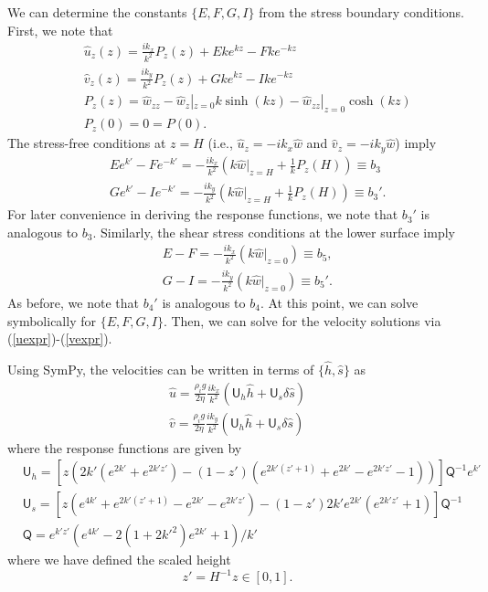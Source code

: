 \documentclass[paper=a4, fontsize=11pt]{article} %
\begin{document}
We can determine the constants $\{E,F,G,I\}$ from the stress boundary conditions.
First, we note that
\begin{eqnarray}
&&\widehat{u}_z(z) = \frac{ik_x }{k^2} P_z(z)
+ E k e^{kz} - F k e^{-kz} \\
&&\widehat{v}_z(z) = \frac{ik_y }{k^2} P_z(z) + G k  e^{kz} - I k e^{-kz} \\
&&P_z(z) = \widehat{w}_{zz}-\widehat{w}_z|_{z=0}k\sinh(kz) - \widehat{w}_{zz}|_{z=0}\cosh(kz)\\
&&P_z(0) = 0 = P(0).
\end{eqnarray}
The stress-free conditions at $z=H$ (i.e., $\widehat{u}_z = -ik_x \widehat{w}$ and
$\widehat{v}_z = -ik_y \widehat{w}$) imply
\begin{eqnarray}
 &&E  e^{{k'}} - F  e^{-{k'}} = -\frac{ik_x}{k^2} \left(k\widehat{w}|_{z=H}+\frac{1}{k}P_{z}(H) \right)\equiv b_3 \label{b4eq}\\
  && G  e^{{k'}} - I  e^{-{k'}} = -\frac{ik_y}{k^2} \left(k\widehat{w}|_{z=H}+\frac{1}{k}P_{z}(H)\right) \equiv b_3'. \label{b4peq}
\end{eqnarray}
For later convenience in deriving the response functions,
we note that $b_3'$ is analogous to $b_3$.
Similarly, the shear stress conditions at the lower surface imply
\begin{eqnarray}
&&E - F  = -\frac{ik_x}{k^2}\left(k\widehat{w}|_{z=0} \right)  \equiv b_5,\\ \label{b5eq}
&&G  -I = -\frac{ik_y}{k^2}(k\widehat{w}|_{z=0}) \equiv b_5'. \label{b5peq}
\end{eqnarray}
As before, we note that $b_4'$ is analogous to $b_4$.
At this point, we can solve symbolically for $\{E,F,G,I\}$.
Then, we can solve for the velocity solutions via (\ref{uexpr})-(\ref{vexpr}).


Using SymPy, the velocities can be written in terms of $\{\widehat{h},\widehat{s}\}$ as
\begin{eqnarray}
\widehat{u} =  \frac{\rho_i g}{2\eta }\frac{ik_x}{k^2}\left(\mathsf{U}_h\widehat{h} +  \mathsf{U}_s\delta\widehat{s}\right) \label{uHf}\\
\widehat{v} = \frac{\rho_i g}{2\eta}\frac{ik_y}{k^2}\left(\mathsf{U}_h\widehat{h} +  \mathsf{U}_s\delta\widehat{s}\right)\label{vHf}
\end{eqnarray}
where the response functions are given by
\begin{align}
&\mathsf{U}_h =  \left[ z(2k'(e^{2k'} + e^{2k'z'}) -(1-z')(e^{2k'(z'+1)} + e^{2k'} - e^{2k'z'} -1 )  )      \right]\mathsf{Q}^{-1}e^{k'}\\
&\mathsf{U}_s =  \left[ z(e^{4k'} +e^{2k'(z'+1)}-e^{2k'}-e^{2k'z'}  ) -(1-z')2k'e^{2k'}(e^{2k'z'}+1)     \right]\mathsf{Q}^{-1}\\
&\mathsf{Q} = e^{{k'z'}}\left(e^{4{k'}} -2(1+2{k'}^2)e^{2{k'}} +1 \right)/k'
\end{align}
where we have defined the scaled height $$z'=H^{-1}z\in[0,1].$$
\end{document}
